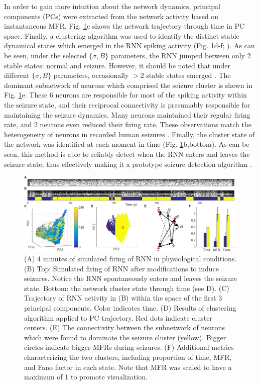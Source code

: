 \documentclass[11pt,a4paper,final]{article}
\begin{document}
In order to gain more intuition about the network dynamics, principal components (PCs) were extracted from the network activity based on instantaneous MFR.
Fig. \ref{seizure}c shows the network trajectory through time in PC space.
Finally, a clustering algorithm was used to identify the distinct stable dynamical states which emerged in the RNN spiking activity (Fig. \ref{seizure}d-f; \citet{sasaki07,santaniello14}).
As can be seen, under the selected $\{\sigma,B\}$ parameters, the RNN jumped between only 2 stable states: normal and seizure.
However, it should be noted that under different $\{\sigma,B\}$ parameters, occasionally $>2$ stable states emerged \citep{mazzucato15}.	
The dominant subnetwork of neurons which comprised the seizure cluster is shown in Fig. \ref{seizure}e.
These 6 neurons are responsible for most of the spiking activity within the seizure state, and their reciprocal connectivity is presumably responsible for maintaining the seizure dynamics.
Many neurons maintained their regular firing rate, and 2 neurons even reduced their firing rate.
These observations match the heterogeneity of neurons in recorded human seizures \citep{bower12}.
Finally, the cluster state of the network was identified at each moment in time (Fig. \ref{seizure}b,bottom).
As can be seen, this method is able to reliably detect when the RNN enters and leaves the seizure state, thus effectively making it a prototype seizure detection algorithm \citep{mormann07,cook13,netoff15}.

\begin{figure}[!ht]
\centering
\includegraphics[width=180mm]{seizure}
\caption[Seizure Induction]{
	(A) 4 minutes of simulated firing of RNN in physiological conditions.
	(B) Top: Simulated firing of RNN after modifications to induce seizures. Notice the RNN spontaneously enters and leaves the seizure state.
	    Bottom: the network cluster state through time (see D).
	(C) Trajectory of RNN activity in (B) within the space of the first 3 principal components. Color indicates time.
	(D) Results of clustering algorithm applied to PC trajectory. Red dots indicate cluster centers.
	(E) The connectivity between the subnetwork of neurons which were found to dominate the seizure cluster (yellow). Bigger circles indicate bigger MFRs during seizures.
	(F) Additional metrics characterizing the two clusters, including proportion of time, MFR, and Fano factor in each state. Note that MFR was scaled to have a maximum of 1 to promote visualization.
}
\label{seizure}
\end{figure}
\end{document}
